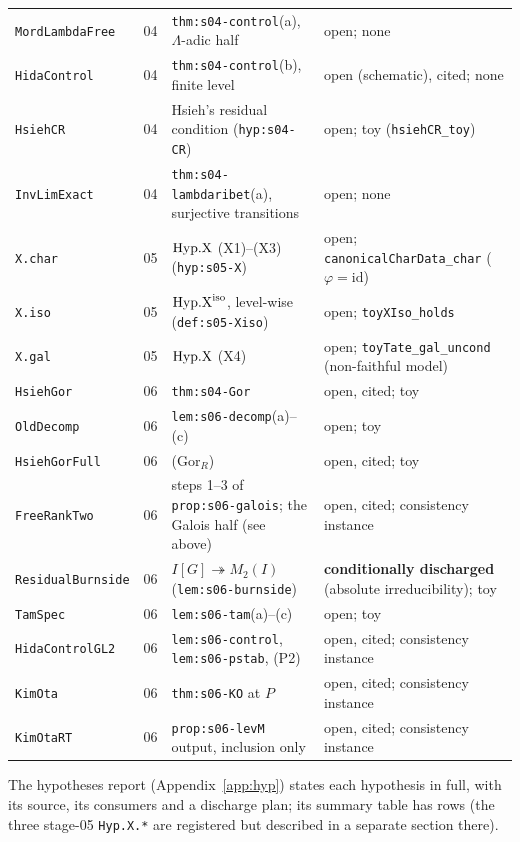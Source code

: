 \begin{longtable}{@{}p{} p{} p{} p{}@{}}
\texttt{MordLambdaFree} & 04 & \texttt{thm:s04-control}(a), $\Lambda$-adic half & open; none\\
\texttt{HidaControl} & 04 & \texttt{thm:s04-control}(b), finite level & open (schematic), cited; none\\
\texttt{HsiehCR} & 04 & Hsieh's residual condition (\texttt{hyp:s04-CR}) & open; toy (\texttt{hsiehCR\_toy})\\
\texttt{InvLimExact} & 04 & \texttt{thm:s04-lambdaribet}(a), surjective transitions & open; none\\
\texttt{X.char} & 05 & $\mathrm{Hyp.X}$ (X1)--(X3) (\texttt{hyp:s05-X}) & open; \texttt{canonicalCharData\_char} ($\varphi=\mathrm{id}$)\\
\texttt{X.iso} & 05 & $\mathrm{Hyp.X}^{\mathrm{iso}}$, level-wise (\texttt{def:s05-Xiso}) & open; \texttt{toyXIso\_holds}\\
\texttt{X.gal} & 05 & $\mathrm{Hyp.X}$ (X4) & open; \texttt{toyTate\_gal\_uncond} (non-faithful model)\\
\texttt{HsiehGor} & 06 & \texttt{thm:s04-Gor} & open, cited; toy\\
\texttt{OldDecomp} & 06 & \texttt{lem:s06-decomp}(a)--(c) & open; toy\\
\texttt{HsiehGorFull} & 06 & (Gor$_R$) & open, cited; toy\\
\texttt{FreeRankTwo} & 06 & steps 1--3 of \texttt{prop:s06-galois}; the Galois half (see above) & open, cited; consistency instance\\
\texttt{ResidualBurnside} & 06 & $I[G]\twoheadrightarrow M_2(I)$ (\texttt{lem:s06-burnside}) & \textbf{conditionally discharged} (absolute irreducibility); toy\\
\texttt{TamSpec} & 06 & \texttt{lem:s06-tam}(a)--(c) & open; toy\\
\texttt{HidaControlGL2} & 06 & \texttt{lem:s06-control}, \texttt{lem:s06-pstab}, (P2) & open, cited; consistency instance\\
\texttt{KimOta} & 06 & \texttt{thm:s06-KO} at $P$ & open, cited; consistency instance\\
\texttt{KimOtaRT} & 06 & \texttt{prop:s06-levM} output, inclusion only & open, cited; consistency instance\\\bottomrule
\end{longtable}
\endgroup
\noindent The hypotheses report (Appendix~\ref{app:hyp}) states each hypothesis in full, with its source, its consumers
and a discharge plan; its summary table has \NumHypTableRows{} rows (the three stage-05 \texttt{Hyp.X.*} are registered but described in a
separate section there).

